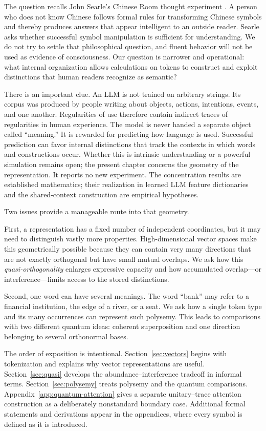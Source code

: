 \documentclass[
  aps,
  reprint,
  superscriptaddress,
  floatfix,
  nofootinbib,
  longbibliography
]{revtex4-2}
\begin{document}
The question recalls John Searle's Chinese Room thought experiment
\cite{searl-80a}.  A person who does not know Chinese follows formal rules for
transforming Chinese symbols and thereby produces answers that appear
intelligent to an outside reader.  Searle asks whether successful symbol
manipulation is sufficient for understanding.  We do not try to settle that
philosophical question, and fluent behavior will not be used as evidence of
consciousness.  Our question is narrower and operational: what internal
organization allows calculations on tokens to construct and exploit distinctions that
human readers recognize as semantic?

There is an important clue.  An LLM is not trained on arbitrary strings.
Its corpus was produced by people writing about objects, actions, intentions,
events, and one another.  Regularities of use therefore contain indirect
traces of regularities in human experience.  The model is never handed a
separate object called ``meaning.''  It is rewarded for predicting how
language is used.  Successful prediction can favor internal distinctions that
track the contexts in which words and constructions occur.  Whether this is
intrinsic understanding or a powerful simulation remains open; the present
chapter concerns the geometry of the representation.  It reports no new
experiment.  The concentration results are established mathematics; their
realization in learned LLM feature dictionaries and the shared-context
construction are empirical hypotheses.

Two issues provide a manageable route into that geometry.

First, a representation has a fixed number of independent coordinates, but it
may need to distinguish vastly more properties.  High-dimensional vector
spaces make this geometrically possible because they can contain very many directions that
are not exactly orthogonal but have small mutual overlaps.  We ask how this
\emph{quasi-orthogonality} enlarges expressive capacity and how accumulated
overlap---or interference---limits access to the stored distinctions.

Second, one word can have several meanings.  The word ``bank'' may refer to a
financial institution, the edge of a river, or a seat.  We ask how a single
token type and its many occurrences can represent such polysemy.  This leads
to comparisons with two different quantum ideas: coherent superposition and
one direction belonging to several orthonormal bases.

The order of exposition is intentional.  Section~\ref{sec:vectors} begins
with tokenization and explains why vector representations are useful.
Section~\ref{sec:quasi} develops the abundance--interference tradeoff in
informal terms.  Section~\ref{sec:polysemy} treats polysemy and the quantum
comparisons.  Appendix~\ref{app:quantum-attention} gives a separate
unitary--trace attention construction as a deliberately nonstandard
boundary case.  Additional formal statements and derivations appear in the
appendices, where every symbol is defined as it is introduced.
\end{document}
